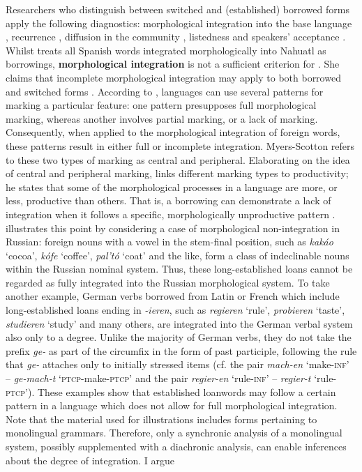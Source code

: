Researchers who distinguish between switched and (established) borrowed forms apply the following diagnostics: morphological integration into the base language \citep{macswan-2000}, recurrence \citep{poplack-sankoff-1984, myers-scotton-duelling-1993}, diffusion in the community \citep{poplack-etal-1988,poplack18}, listedness \citep{milroy-code-switching-1995, muysken-bilingual-2000, muhamedowa-untersuchung-2006, stammers-deuchar-2012} and speakers' acceptance \citep{poplack-sankoff-1984}. Whilst \citet{macswan-2000} treats all Spanish words integrated morphologically into Nahuatl as borrowings, \textbf{morphological integration} is not a sufficient criterion for \citet{myers-scotton-duelling-1993}. She claims that incomplete morphological integration may apply to both borrowed and switched forms \citep[191]{myers-scotton-duelling-1993}. According to \citet[183--188]{myers-scotton-duelling-1993}, languages can use several patterns for marking a particular feature: one pattern presupposes full morphological marking, whereas another involves partial marking, or a lack of marking. Consequently, when applied to the morphological integration of foreign words, these patterns result in either full or incomplete integration. Myers-Scotton refers to these two types of marking as central and peripheral. Elaborating on the idea of central and peripheral marking, \citet[52--53]{boumans-syntax-1998} links different marking types to productivity; he states that some of the morphological processes in a language are more, or less, productive than others. That is, a borrowing can demonstrate a lack of integration when it follows a specific, morphologically unproductive pattern \citep[cf.][]{dressler04}. \citet[45]{muhamedowa-untersuchung-2006} illustrates this point by considering a case of morphological non-integration in Russian: foreign nouns with a vowel in the stem-final position, such as \textit{kak\'{a}o} `cocoa', \textit{k\'{o}fe} `coffee', \textit{pal't\'{o}} `coat' and the like, form a class of indeclinable nouns within the Russian nominal system. Thus, these long-established loans cannot be regarded as fully integrated into the Russian morphological system. To take another example, German verbs borrowed from Latin or French which include long-established loans ending in \textit{-ieren}, such as \textit{regieren} `rule', \textit{probieren} `taste', \textit{studieren} `study' and many others, are integrated into the German verbal system also only to a degree. Unlike the majority of German verbs, they do not take the prefix \textit{ge-} as part of the circumfix in the form of past participle, following the rule that \textit{ge-} attaches only to initially stressed items (cf. the pair \textit{mach-en} `make-\textsc{inf}' -- \textit{ge-mach-t} `\textsc{ptcp}-make-\textsc{ptcp}' and  the pair \textit{regier-en} `rule-\textsc{inf}' -- \textit{regier-t} `rule-\textsc{ptcp}'). These examples show that established loanwords may follow a certain pattern in a language which does not allow for full morphological integration. Note that the material used for illustrations includes forms pertaining to monolingual grammars. Therefore, only a synchronic analysis of a monolingual system, possibly supplemented with a diachronic analysis, can enable inferences about the degree of integration. I argue 